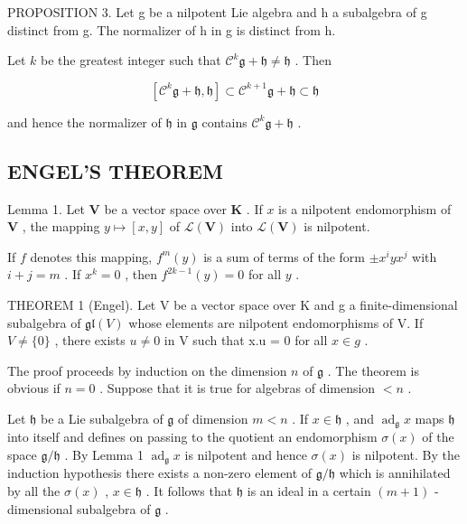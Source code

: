 PROPOSITION 3. Let g be a nilpotent Lie algebra and h a subalgebra of g distinct from g. The normalizer of h in g is distinct from h.

Let \(k\) be the greatest integer such that \(\mathcal{C}^k\mathfrak{g} + \mathfrak{h}\neq \mathfrak{h}\) . Then

\[
[ \mathcal {C} ^ {k} \mathfrak {g} + \mathfrak {h}, \mathfrak {h} ] \subset \mathcal {C} ^ {k + 1} \mathfrak {g} + \mathfrak {h} \subset \mathfrak {h}
\]

and hence the normalizer of \(\mathfrak{h}\) in \(\mathfrak{g}\) contains \(\mathcal{C}^k\mathfrak{g} + \mathfrak{h}\) .

\subsection{ENGEL'S THEOREM}

Lemma 1. Let \(\mathbf{V}\) be a vector space over \(\mathbf{K}\) . If \(x\) is a nilpotent endomorphism of \(\mathbf{V}\) , the mapping \(y \mapsto [x, y]\) of \(\mathcal{L}(\mathbf{V})\) into \(\mathcal{L}(\mathbf{V})\) is nilpotent.

If \(f\) denotes this mapping, \(f^m(y)\) is a sum of terms of the form \(\pm x^i y x^j\) with \(i + j = m\) . If \(x^k = 0\) , then \(f^{2k - 1}(y) = 0\) for all \(y\) .

THEOREM 1 (Engel). Let V be a vector space over K and g a finite-dimensional subalgebra of \(\mathfrak{gl}(V)\) whose elements are nilpotent endomorphisms of V. If \(V \neq \{0\}\) , there exists \(u \neq 0\) in V such that x.u = 0 for all \(x \in g\) .

The proof proceeds by induction on the dimension \(n\) of \(\mathfrak{g}\) . The theorem is obvious if \(n = 0\) . Suppose that it is true for algebras of dimension \(< n\) .

Let \(\mathfrak{h}\) be a Lie subalgebra of \(\mathfrak{g}\) of dimension \(m < n\) . If \(x \in \mathfrak{h}\) , and \(\operatorname{ad}_{\mathfrak{g}} x\) maps \(\mathfrak{h}\) into itself and defines on passing to the quotient an endomorphism \(\sigma(x)\) of the space \(\mathfrak{g} / \mathfrak{h}\) . By Lemma 1 \(\operatorname{ad}_{\mathfrak{g}} x\) is nilpotent and hence \(\sigma(x)\) is nilpotent. By the induction hypothesis there exists a non-zero element of \(\mathfrak{g} / \mathfrak{h}\) which is annihilated by all the \(\sigma(x)\) , \(x \in \mathfrak{h}\) . It follows that \(\mathfrak{h}\) is an ideal in a certain \((m + 1)\) -dimensional subalgebra of \(\mathfrak{g}\) .

